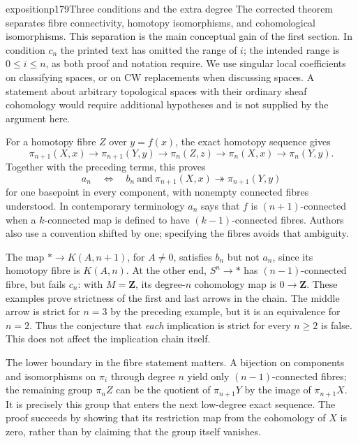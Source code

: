 \begin{dcomment}{exposition}{p179}{Three conditions and the extra degree}
The corrected theorem separates fibre connectivity, homotopy isomorphisms, and cohomological isomorphisms. This separation is the main conceptual gain of the first section. In condition $c_n$ the printed text has omitted the range of $i$; the intended range is $0\leq i\leq n$, as both proof and notation require. We use singular local coefficients on classifying spaces, or on CW replacements when discussing spaces. A statement about arbitrary topological spaces with their ordinary sheaf cohomology would require additional hypotheses and is not supplied by the argument here.

For a homotopy fibre $Z$ over $y=f(x)$, the exact homotopy sequence gives
\[
 \pi_{n+1}(X,x)\longrightarrow\pi_{n+1}(Y,y)
 \longrightarrow\pi_n(Z,z)\longrightarrow
 \pi_n(X,x)\longrightarrow\pi_n(Y,y).
\]
Together with the preceding terms, this proves
\[
 a_n\quad\Longleftrightarrow\quad
 b_n\ \text{and}\ 
 \pi_{n+1}(X,x)\twoheadrightarrow\pi_{n+1}(Y,y)
\]
for one basepoint in every component, with nonempty connected fibres understood. In contemporary terminology $a_n$ says that $f$ is $(n+1)$-connected when a $k$-connected map is defined to have $(k-1)$-connected fibres. Authors also use a convention shifted by one; specifying the fibres avoids that ambiguity.

The map $*\to K(A,n+1)$, for $A\ne0$, satisfies $b_n$ but not $a_n$, since its homotopy fibre is $K(A,n)$. At the other end, $S^n\to *$ has $(n-1)$-connected fibre, but fails $c_n$: with $M=\mathbf Z$, its degree-$n$ cohomology map is $0\to\mathbf Z$. These examples prove strictness of the first and last arrows in the chain. The middle arrow is strict for $n=3$ by the preceding example, but it is an equivalence for $n=2$. Thus the conjecture that \emph{each} implication is strict for every $n\geq2$ is false. This does not affect the implication chain itself.

The lower boundary in the fibre statement matters. A bijection on components and isomorphisms on $\pi_i$ through degree $n$ yield only $(n-1)$-connected fibres; the remaining group $\pi_nZ$ can be the quotient of $\pi_{n+1}Y$ by the image of $\pi_{n+1}X$. It is precisely this group that enters the next low-degree exact sequence. The proof succeeds by showing that its restriction map from the cohomology of $X$ is zero, rather than by claiming that the group itself vanishes.
\end{dcomment}


